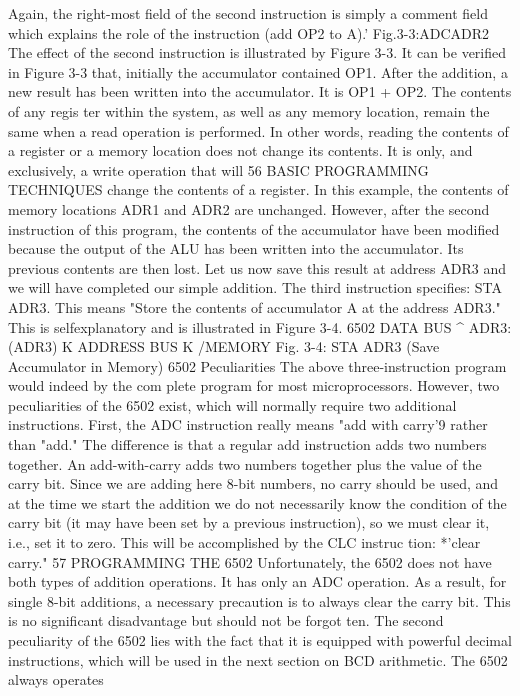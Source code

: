 \documentclass{book}
\begin{document}
Again, the right-most field of the second instruction is simply a
comment field which explains the role of the instruction (add OP2
to A).'
Fig.3-3:ADCADR2
The effect of the second instruction is illustrated by Figure 3-3.
It can be verified in Figure 3-3 that, initially the accumulator
contained OP1. After the addition, a new result has been written
into the accumulator. It is OP1 + OP2. The contents of any regis
ter within the system, as well as any memory location, remain the
same when a read operation is performed. In other words, reading
the contents of a register or a memory location does not change its
contents. It is only, and exclusively, a write operation that will
56
BASIC PROGRAMMING TECHNIQUES
change the contents of a register. In this example, the contents of
memory locations ADR1 and ADR2 are unchanged. However,
after the second instruction of this program, the contents of the
accumulator have been modified because the output of the ALU
has been written into the accumulator. Its previous contents are
then lost.
Let us now save this result at address ADR3 and we will have
completed our simple addition.
The third instruction specifies: STA ADR3. This means "Store
the contents of accumulator A at the address ADR3." This is selfexplanatory
and is illustrated in Figure 3-4.
6502
DATA BUS ^
ADR3:
(ADR3) K
ADDRESS BUS K
/MEMORY
Fig. 3-4: STA ADR3 (Save Accumulator in Memory)
6502 Peculiarities
The above three-instruction program would indeed by the com
plete program for most microprocessors. However, two
peculiarities of the 6502 exist, which will normally require two
additional instructions.
First, the ADC instruction really means "add with carry'9
rather than "add." The difference is that a regular add instruction
adds two numbers together. An add-with-carry adds two numbers
together plus the value of the carry bit. Since we are adding here
8-bit numbers, no carry should be used, and at the time we start
the addition we do not necessarily know the condition of the carry
bit (it may have been set by a previous instruction), so we must clear
it, i.e., set it to zero. This will be accomplished by the CLC instruc
tion: *'clear carry."
57
PROGRAMMING THE 6502
Unfortunately, the 6502 does not have both types of addition
operations. It has only an ADC operation. As a result, for single
8-bit additions, a necessary precaution is to always clear the carry
bit. This is no significant disadvantage but should not be forgot
ten.
The second peculiarity of the 6502 lies with the fact that it is
equipped with powerful decimal instructions, which will be used
in the next section on BCD arithmetic. The 6502 always operates
\end{document}
